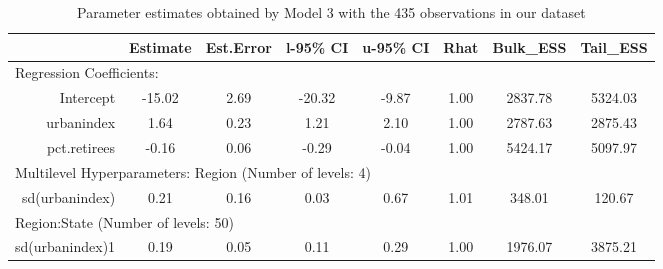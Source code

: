 \documentclass[12pt]{article}
\begin{document}
\begin{table}[h]
	\centering
	\begin{adjustbox}{max width=\textwidth}
	\begin{tabular}{rccccccc}
		\hline
		& Estimate & Est.Error & l-95\% CI & u-95\% CI & Rhat & Bulk\_ESS & Tail\_ESS \\ 
		\hline
		 \multicolumn{8}{l}{Regression Coefficients:} \\
		Intercept & -15.02 & 2.69 & -20.32 & -9.87 & 1.00 & 2837.78 & 5324.03 \\ 
		urbanindex & 1.64 & 0.23 & 1.21 & 2.10 & 1.00 & 2787.63 & 2875.43 \\ 
		pct.retirees & -0.16 & 0.06 & -0.29 & -0.04 & 1.00 & 5424.17 & 5097.97 \\
		\midrule
		\multicolumn{8}{l}{Multilevel Hyperparameters: Region (Number of levels: 4)} \\ 
		sd(urbanindex) & 0.21 & 0.16 & 0.03 & 0.67 & 1.01 & 348.01 & 120.67 \\ 
		\midrule
		\multicolumn{8}{l}{Region:State (Number of levels: 50)}  \\
		sd(urbanindex)1 & 0.19 & 0.05 & 0.11 & 0.29 & 1.00 & 1976.07 & 3875.21 \\ 
		\hline
	\end{tabular}
	\end{adjustbox}
	\caption{Parameter estimates obtained by Model 3 with the 435 observations in our dataset}
	\label{tab:model3}
\end{table}
\end{document}

